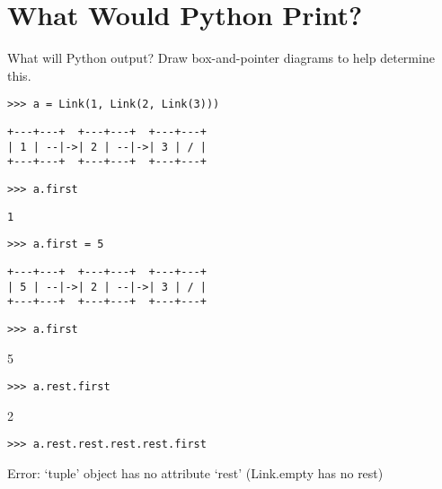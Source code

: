 \documentclass{exam}
\begin{document}
\section{What Would Python Print?}
\begin{questions}
\begin{blocksection}
\question What will Python output? Draw box-and-pointer diagrams to help determine this.

\begin{lstlisting}
>>> a = Link(1, Link(2, Link(3)))
\end{lstlisting}
\begin{solution}[0in]
\begin{lstlisting}
+---+---+  +---+---+  +---+---+
| 1 | --|->| 2 | --|->| 3 | / |
+---+---+  +---+---+  +---+---+
\end{lstlisting}
\end{solution}

\begin{lstlisting}
>>> a.first
\end{lstlisting}
\begin{solution}[.25in]
\begin{lstlisting}
1
\end{lstlisting}
\end{solution}

\begin{lstlisting}
>>> a.first = 5
\end{lstlisting}
\begin{solution}[0in]
\begin{lstlisting}
+---+---+  +---+---+  +---+---+
| 5 | --|->| 2 | --|->| 3 | / |
+---+---+  +---+---+  +---+---+
\end{lstlisting}
\end{solution}

\begin{lstlisting}
>>> a.first
\end{lstlisting}
\begin{solution}[.25in]
5
\end{solution}

\begin{lstlisting}
>>> a.rest.first
\end{lstlisting}
\begin{solution}[.25in]
2
\end{solution}

\begin{lstlisting}
>>> a.rest.rest.rest.rest.first
\end{lstlisting}
\begin{solution}[.25in]
Error: ‘tuple’ object has no attribute ‘rest’ (Link.empty has no rest)
\end{solution}
\end{blocksection}


\end{questions}
\end{document}
